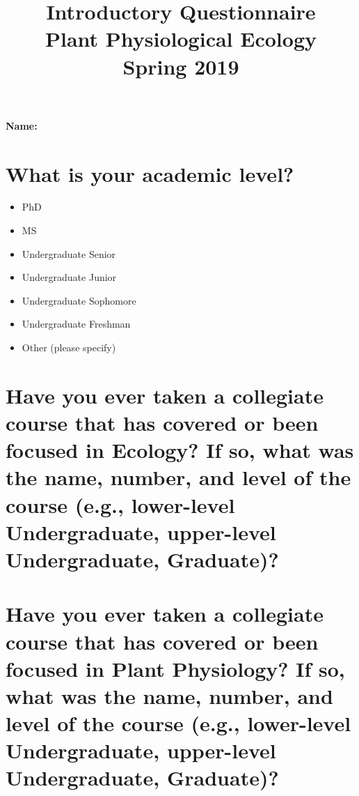 \documentclass[12pt, notitlepage]{article}   	%
\title{
	\textbf{
		Introductory Questionnaire
	} \\
	\large{Plant Physiological Ecology} \\
	\large{Spring 2019}
}
\date{\vspace{-5ex}}
\def\wl{\par \vspace{\baselineskip}}
\begin{document}
\maketitle

\Large{\textbf{Name:} \underline{\hspace{10cm}}}

\section{What is your academic level?}
\begin{itemize}
	\item{\underline{\hspace{1cm}} PhD}
	\item{\underline{\hspace{1cm}} MS}
	\item{\underline{\hspace{1cm}} Undergraduate Senior}
	\item{\underline{\hspace{1cm}} Undergraduate Junior}
	\item{\underline{\hspace{1cm}} Undergraduate Sophomore}
	\item{\underline{\hspace{1cm}} Undergraduate Freshman}
	\item{\underline{\hspace{1cm}} Other (please specify)}
\end{itemize}

\section{Have you ever taken a collegiate course that has covered or been focused in 
Ecology? If so, what was the name, number, and level of the course (e.g., lower-level Undergraduate,
upper-level Undergraduate, Graduate)?}

\wl
\wl
\wl
\wl
\wl
\wl
\wl
\wl

\section{Have you ever taken a collegiate course that has covered or been focused in 
Plant Physiology? If so, what was the name, number, and level of the course 
(e.g., lower-level Undergraduate, upper-level Undergraduate, Graduate)?}

\newpage
\end{document}
